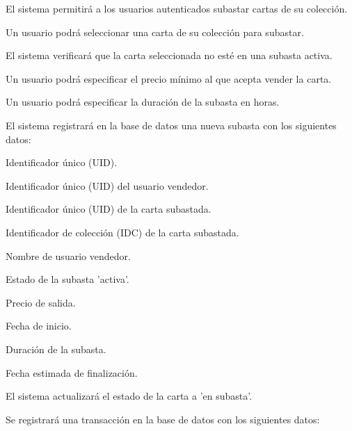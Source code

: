 

\hypertarget{req_subastas_pujas}{}
\begin{RFSubastas}
	\item El sistema permitirá a los usuarios autenticados subastar cartas de su colección.
	\begin{RFSubastas}
		\item Un usuario podrá seleccionar una carta de su colección para subastar.
		\item El sistema verificará que la carta seleccionada no esté en una subasta activa.
		\item Un usuario podrá especificar el precio mínimo al que acepta vender la carta.
		\item Un usuario podrá especificar la duración de la subasta en horas.
		\item El sistema registrará en la base de datos una nueva subasta con los siguientes datos:
		\begin{RFSubastas}
			\item Identificador único (UID).
			\item Identificador único (UID) del usuario vendedor.
			\item Identificador único (UID) de la carta subastada.
			\item Identificador de colección (IDC) de la carta subastada.
			\item Nombre de usuario vendedor.
			\item Estado de la subasta 'activa'.
			\item Precio de salida.
			\item Fecha de inicio.
			\item Duración de la subasta.
			\item Fecha estimada de finalización.
		\end{RFSubastas}
		\item El sistema actualizará el estado de la carta a 'en subasta'.
		\item Se registrará una transacción en la base de datos con los siguientes datos:

\end{RFSubastas}
\end{RFSubastas}
